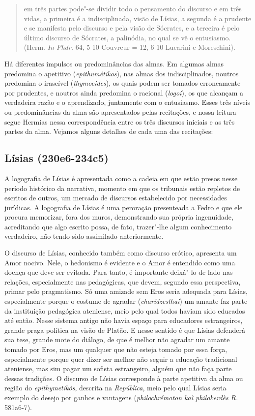  

\begin{quote}
em três partes pode"-se dividir todo o pensamento do discurso e em três
vidas,
 a primeira é a indisciplinada, visão de Lísias, a segunda é a
prudente e se manifesta pelo discurso e pela visão de Sócrates, e a
terceira é pelo último discurso de Sócrates, a palinódia, no qual se vê
o entusiasmo. (Herm. \emph{In Phdr.} 64, 5-10 Couvreur = 12, 6-10
Lucarini e Moreschini).
\end{quote}

 

Há diferentes impulsos ou predominâncias das almas. Em algumas almas
predomina o apetitivo (\emph{epithumétikos}), nas almas dos
indisciplinados, noutros predomina o irascível (\emph{thymoeides}), os
quais podem ser tomados erroneamente por prudentes, e noutros ainda
predomina o racional (\emph{logoi}), os que alcançam a verdadeira razão
e o aprendizado, juntamente com o entusiasmo. Esses três níveis ou
predominâncias da alma são apresentados pelas recitações, e nossa leitura
segue Hermias nessa correspondência entre os três discursos iniciais e
as três partes da alma. Vejamos alguns detalhes de cada uma das
recitações:


\subsection{Lísias (230e6-234c5)} 


A logografia de Lísias é apresentada
como a cadeia em que estão presos nesse período histórico da narrativa,
momento em que os tribunais estão repletos de escritos de outros, um
mercado de discursos estabelecido por necessidades jurídicas. 
A logografia de Lísias é uma peroração presenteada a Fedro e que ele
procura memorizar, fora dos muros, demonstrando sua própria ingenuidade,
acreditando que algo escrito possa, de fato, trazer"-lhe algum
conhecimento verdadeiro, não tendo sido assimilado anteriormente.

O discurso de Lísias, conhecido também como discurso erótico, apresenta
um Amor nocivo. Nele, o hedonismo é evidente e o Amor é entendido como
uma doença que deve ser evitada. Para tanto, é importante deixá"-lo de
lado nas relações, especialmente nas pedagógicas, que devem, segundo
essa perspectiva, primar pelo pragmatismo. Só uma amizade sem Eros
seria adequada para Lísias, especialmente porque o costume de agradar
(\emph{charídzesthai}) um amante faz parte da instituição pedagógica
ateniense, meio pelo qual todos haviam sido educados até então. Nesse
sistema antigo não havia espaço para educadores estrangeiros, grande
praga política na visão de Platão. E nesse sentido é que Lísias
defenderá sua tese, grande mote do diálogo, de que é melhor não agradar
um amante tomado por Eros, mas um qualquer que não esteja tomado por
essa força, especialmente porque quer dizer ser melhor não seguir a
educação tradicional ateniense, mas sim pagar um sofista estrangeiro,
alguém que não faça parte dessas tradições. O discurso de Lísias
corresponde à parte apetitiva da alma ou região do \emph{epithymetikós},
descrita na \emph{República}, meio pelo qual Lísias seria exemplo do
desejo por ganhos e vantagens (\emph{philochrématon kaì
philokerdès} \emph{R.} 581a6-7).


